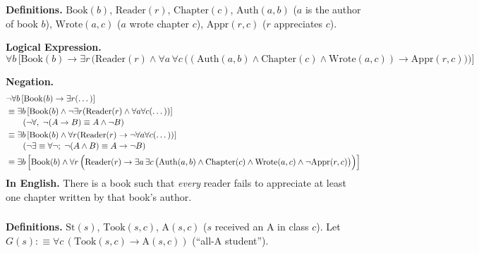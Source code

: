 \documentclass[11pt,a4paper]{article}
\theoremstyle{definition}
\begin{document}


\subsubsection{}
\textbf{Definitions.} $\mathrm{Book}(b)$, $\mathrm{Reader}(r)$, $\mathrm{Chapter}(c)$, $\mathrm{Auth}(a,b)$ ($a$ is the author of book $b$), $\mathrm{Wrote}(a,c)$ ($a$ wrote chapter $c$), $\mathrm{Appr}(r,c)$ ($r$ appreciates $c$).

\textbf{Logical Expression.}
\[
\forall b\,\Big[\mathrm{Book}(b)\to\exists r\,\Big(\mathrm{Reader}(r)\wedge\forall a\,\forall c\,\big((\mathrm{Auth}(a,b)\wedge\mathrm{Chapter}(c)\wedge\mathrm{Wrote}(a,c))\to\mathrm{Appr}(r,c)\big)\Big)\Big]
\]

\textbf{Negation.}
\begin{align*}
&\neg\forall b\,[\mathrm{Book}(b)\to\exists r(\dots)]\\
&\equiv\exists b\,[\mathrm{Book}(b)\wedge\neg\exists r(\mathrm{Reader}(r)\wedge\forall a\forall c(\dots))]\\[-2pt]
&\qquad\small (\neg\forall,\ \neg(A\to B)\equiv A\wedge\neg B)\\
&\equiv\exists b\,[\mathrm{Book}(b)\wedge\forall r(\mathrm{Reader}(r)\to\neg\forall a\forall c(\dots))]\\[-2pt]
&\qquad\small (\neg\exists\equiv\forall\neg;\ \neg(A\wedge B)\equiv A\to\neg B)\\
&\equiv\exists b\,\Big[\mathrm{Book}(b)\wedge\forall r\,\Big(\mathrm{Reader}(r)\to\exists a\,\exists c\,\big(\mathrm{Auth}(a,b)\wedge\mathrm{Chapter}(c)\wedge\mathrm{Wrote}(a,c)\wedge\neg\mathrm{Appr}(r,c)\big)\Big)\Big]
\end{align*}
\textbf{In English.} There is a book such that \emph{every} reader fails to appreciate at least one chapter written by that book's author.











\subsubsection{}
\textbf{Definitions.} $\mathrm{St}(s)$, $\mathrm{Took}(s,c)$, $\mathrm{A}(s,c)$ ($s$ received an A in class $c$). Let $G(s):\equiv\forall c\,(\mathrm{Took}(s,c)\to\mathrm{A}(s,c))$ (``all-A student'').
\end{document}
